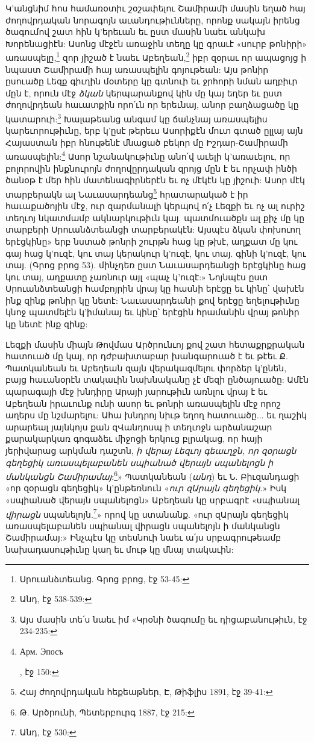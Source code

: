 \documentclass{article}
\begin{document}
{Կ'անցնիմ հոս համառօտիւ շօշափելու Շամիրամի մասին եղած հայ ժողովրդական նորագոյն աւանդութիւնները, որոնք սակայն իրենց ծագումով շատ հին կ'երեւան եւ ըստ մասին նաեւ անկախ Խորենացիէն: Ասոնց մէջէն առաջին տեղը կը գրաւէ «սուրբ թոնիրի» առասպելը,\footnote{Սրուանձտեանց. Գրոց բրոց, էջ 53-45:} զոր յիշած է նաեւ Աբեղեան,\footnote{Անդ, էջ 538-539:} իբր զօրաւ որ ապացոյց ի նպաստ Շամիրամի հայ առասպելին գոյութեան: Այս թոնիր ըսուածը Լեզք գիւղին մօտերը կը գտնուի եւ ջրհորի նման աղբիւր մըն է, որուն մէջ \emph{ձկան} կերպարանքով կին մը կայ եղեր եւ ըստ ժողովրդեան հաւատքին որո՛ւն որ երեւնայ, անոր բաղձացածը կը կատարուի:\footnote{Այս մասին տե՛ս նաեւ իմ «Կրօնի ծագումը եւ դիցաբանութիւն, էջ 234-235:} Խալաթեանց անգամ կը ճանչնայ առասպելիս կարեւորութիւնը, երբ կ'ըսէ թերեւս Ասորիքէն մուտ գտած ըլլայ այն Հայաստան իբր հնութենէ մնացած բեկոր մը Իշդար-Շամիրամի առասպելին:\footnote{\begin{russian}Арм. Эпосъ\end{russian}, էջ 150:} Ասոր նշանակութիւնը անո՛վ աւելի կ'առաւելու, որ բոլորովին ինքնուրոյն ժողովըրդական զրոյց մըն է եւ որչափ ինծի ծանօթ է մեր հին մատենագիրներէն եւ ոչ մէկէն կը յիշուի: Ասոր մէկ տարբերակն ալ Նաւասարդեանց\footnote{Հայ ժողովրդական հեքեաթներ, Է, Թիֆլիս 1891, էջ 39-41:} հրատարակած է իր հաւաքածոյին մէջ, ուր զարմանալի կերպով ո՛չ Լեզքի եւ ոչ ալ ուրիշ տեղւոյ նկատմամբ ակնարկութիւն կայ. պատմուածքն ալ քիչ մը կը տարբերի Սրուանձտեանցի տարբերակէն: Այսպէս ձկան փոխուող երէցկինը» երբ նստած թոնրի շուրթն հաց կը թխէ, աղքատ մը կու գայ հաց կ'ուզէ, կու տայ կերակուր կ'ուզէ, կու տայ. գինի կ'ուզէ, կու տայ. (Գրոց բրոց 53). մինչդեռ ըստ Նաւասարդեանցի երէցկինը հաց կու տայ, աղքատը չառնուր այլ «պաչ կ'ուզէ:» Նոյնպէս ըստ Սրուանձտեանցի համբոյրին վրայ կը հասնի երէցը եւ կինը՝ վախէն ինք զինք թոնիր կը նետէ: Նաւասարդեանի քով երէցը եղելութիւնը կնոջ պատմելէն կ'իմանայ եւ կինը՝ երէցին հրամանին վրայ թոնիր կը նետէ ինք զինք:

Լեզքի մասին միայն Թովմաս Արծրունւոյ քով շատ հետաքրքրական հատուած մը կայ, որ դժբախտաբար խանգարուած է եւ թէեւ Ք. Պատկանեան եւ Աբեղեան զայն վերակազմելու փորձեր կ'ընեն, բայց հաւանօրէն տակաւին նախնականը չէ մեզի ընծայուածը: Ամէն պարագայի մէջ խնդիրը Արայի յարութիւն առնլու վրայ է եւ Աբեղեան իրաւունք ունի ասոր եւ թոնրի առասպելին մէջ որոշ աղերս մը նշմարելու: Ահա խնդրոյ նիւթ եղող հատուածը... եւ ղաշիկ արարեալ յայնկոյս քան զՎանդոսպ ի տեղւոջն արձանաշար քարակարկառ գոգաձեւ միջոցի երկուց բլրակաց, որ հայի յերիվարաց արկման դաշտն, \emph{ի վերայ Լեզւոյ գեաւղջն, որ զօրացն գեղեցիկ առասպելաբանեն սպիանած վերայն սպանելոցն ի մանկանցն Շամիրամայ}:\footnote{Թ. Արծրունի, Պետերբուրգ 1887, էջ 215:}» Պատկանեան (\emph{անդ}) եւ Ն. Բիւզանդացի «որ զօրացն գեղեցիկ» կ'ընթեռնուն «\emph{ուր զԱրայն գեղեցիկ}.» Իսկ «սպիանած վերայն սպանելոցն» Աբեղեան կը սրբագրէ «սպիանալ \emph{վիրացն} սպանելոյն.\footnote{Անդ, էջ 530:}» որով կը ստանանք. «ուր զԱրայն գեղեցիկ առասպելաբանեն սպիանալ վիրացն սպանելոյն ի մանկանցն Շամիրամայ:» Ինչպէս կը տեսնուի նաեւ ա՛յս սրբագրութեամբ նախադասութիւնը կաղ եւ մութ կը մնայ տակաւին:

}
\end{document}
